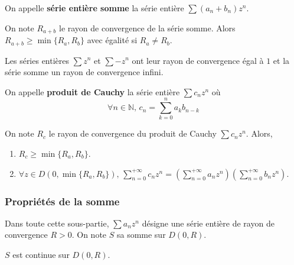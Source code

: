   \begin{definition}
    On appelle \textbf{série entière somme} la série entière $\sum (a_n + b_n) z^n$.
  \end{definition}

  \begin{proposition}
    On note $R_{a+b}$ le rayon de convergence de la série somme. Alors $R_{a+b} \geq \min \{R_a, R_b\}$ avec égalité si $R_a \neq R_b$.
  \end{proposition}


  \begin{example}
    Les séries entières $\sum z^n$ et $\sum -z^n$ ont leur rayon de convergence égal à $1$ et la série somme un rayon de convergence infini.
  \end{example}


  \begin{definition}
    On appelle \textbf{produit de Cauchy} la série entière $\sum c_n z^n$ où
    \[ \forall n \in \mathbb{N}, \, c_n = \sum_{k=0}^n a_k b_{n-k} \]
  \end{definition}

  \begin{proposition}
    On note $R_{c}$ le rayon de convergence du produit de Cauchy $\sum c_n z^n$. Alors,
    \begin{enumerate}[label=(\roman*)]
      \item $R_c \geq \min \{R_a, R_b\}$.
      \item $\forall z \in D(0, \min \{R_a, R_b\}), \, \sum_{n = 0}^{+\infty} c_n z^n = (\sum_{n = 0}^{+\infty} a_n z^n) (\sum_{n = 0}^{+\infty} b_n z^n)$.
    \end{enumerate}
  \end{proposition}

  \subsubsection{Propriétés de la somme}


  Dans toute cette sous-partie, $\sum a_n z^n$ désigne une série entière de rayon de convergence $R > 0$. On note $S$ sa somme sur $D(0,R)$.

  \begin{proposition}
    $S$ est continue sur $D(0,R)$.
  \end{proposition}

